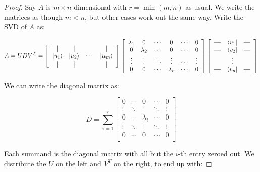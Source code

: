 \documentclass{amsbook}
\newcommand*{\vertbar}{\rule[-1ex]{0.5pt}{2.5ex}}
\newcommand*{\horzbar}{\rule[.5ex]{2.5ex}{0.5pt}}
\begin{document}
\begin{proof}
Say $A$ is $m\times n$ dimensional with $r=\min(m, n)$ as usual.  We write the matrices as though $m<n$, but other cases work out the same way.  Write the SVD of $A$ as:

$$
A = UDV^T =
\left[
  \begin{array}{cccc}
    \vertbar & \vertbar & & \vertbar \\
    |u_1\rangle    & |u_2\rangle   & \cdots & |u_m\rangle    \\
    \vertbar & \vertbar & & \vertbar 
  \end{array}
\right]
\left[
\begin{array}{cccccc}
\lambda_1 & 0 & \cdots & 0 & \cdots & 0 \\
0 & \lambda_2 & \cdots & 0 & \cdots & 0 \\
\vdots & \vdots & \ddots & \vdots & \cdots & \vdots \\
0 & 0 & \cdots & \lambda_r & \cdots & 0 \\
\end{array}
\right]
\left[
  \begin{array}{ccc}
    \horzbar & \langle v_1| & \horzbar \\
    \horzbar & \langle v_2|& \horzbar \\
             & \vdots    &          \\
    \horzbar & \langle v_n|& \horzbar
  \end{array}
\right]
$$

\noindent
We can write the diagonal matrix as:

$$
D = \sum_{i=1}^r \left[\begin{array}{ccccc}
0 & \cdots & 0 & \cdots & 0 \\
\vdots & \ddots & \vdots & \ddots & \vdots \\
0 & \cdots & \lambda_i & \cdots & 0 \\
\vdots & \ddots & \vdots & \ddots & \vdots \\
0 & \cdots & 0 & \cdots & 0 \\
\end{array}\right]
$$

\noindent
Each summand is the diagonal matrix with all but the $i$-th entry zeroed out.  We distribute the $U$ on the left and $V^T$ on the right, to end up with:


\end{proof}
\end{document}

